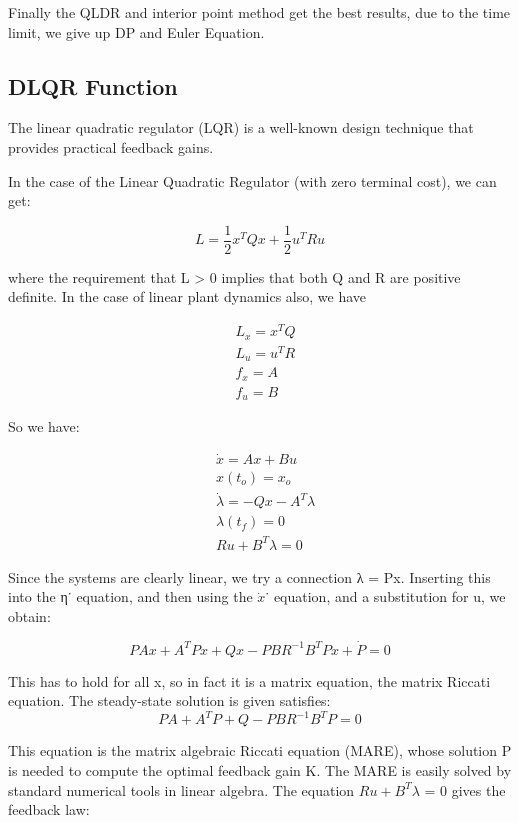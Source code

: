 \documentclass{mcmthesis}
\begin{document}
Finally the QLDR and interior point method get the best results, due to the time limit, we give up DP and Euler Equation.

\subsection{DLQR Function}

The linear quadratic regulator (LQR) is a well-known design technique that provides practical feedback gains.\cite{journals/corr/WangMD14}\cite{conf/iros/AmesK19}

In the case of the Linear Quadratic Regulator (with zero terminal cost), we can get:

$$L=\frac{1}{2} x^{T} Q x+\frac{1}{2} u^{T} R u$$

where the requirement that L > 0 implies that both Q and R are positive definite. In the
case of linear plant dynamics also, we have


$$\begin{aligned}
&L_{x} =x^{T} Q \\
&L_{u} =u^{T} R \\
&f_{x} =A \\
&f_{u} =B
\end{aligned}$$

So we have:

$$\begin{aligned}
&\dot{x} =A x+B u \\
&x\left(t_{o}\right) =x_{o} \\
&\dot{\lambda}=-Q x-A^{T} \lambda  \\
&\lambda\left(t_{f}\right) =0 \\
&R u+B^{T} \lambda =0
\end{aligned}$$

Since the systems are clearly linear, we try a connection λ = Px. Inserting this into the η˙
equation, and then using the $\dot{x}$˙ equation, and a substitution for u, we obtain:

$$P A x+A^{T} P x+Q x-P B R^{-1} B^{T} P x+\dot{P}=0$$

This has to hold for all x, so in fact it is a matrix equation, the matrix Riccati equation.
The steady-state solution is given satisfies:
$$P A+A^{T} P+Q-P B R^{-1} B^{T} P=0$$

This equation is the matrix algebraic Riccati equation (MARE), whose solution P is needed
to compute the optimal feedback gain K. The MARE is easily solved by standard numerical
tools in linear algebra.
The equation $Ru + B^T \lambda$ = 0 gives the feedback law:
\end{document}
